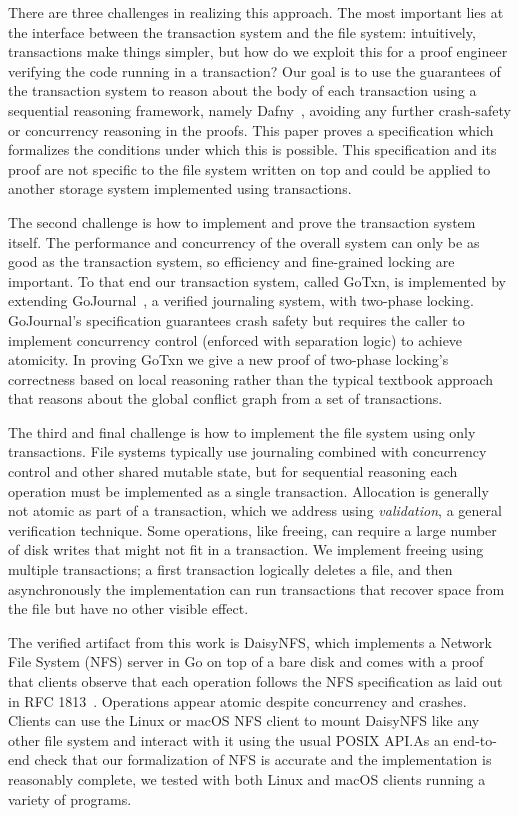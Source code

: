 There are three challenges in realizing this approach. The most important lies
at the interface between the transaction system and the file system:
intuitively, transactions make things simpler, but how do we exploit this for a
proof engineer verifying the code running in a transaction? Our goal is to use
the guarantees of the transaction system to reason about the body of each
transaction using a sequential reasoning framework, namely Dafny~\cite{leino:dafny}, avoiding any
further crash-safety or concurrency reasoning in the proofs. This paper proves a
specification which formalizes the conditions under which this is possible. This
specification and its proof are not specific to the file system written on top
and could be applied to another storage system implemented using transactions.

The second challenge is how to implement and prove the transaction system
itself. The performance and concurrency of the overall system can only be as
good as the transaction system, so efficiency and fine-grained locking are
important. To that end our transaction system, called GoTxn, is implemented by
extending GoJournal~\cite{chajed:gojournal}, a verified journaling system, with
two-phase locking. GoJournal's specification guarantees crash safety but
requires the caller to implement concurrency control (enforced with separation logic) to achieve atomicity.
In proving GoTxn we give a new proof of two-phase
locking's correctness based on local reasoning rather than
the typical textbook approach that reasons about the global conflict graph from
a set of transactions.

The third and final challenge is how to implement the file system using only
transactions. File systems typically use journaling combined with concurrency
control and other shared mutable state, but for sequential reasoning each
operation must be implemented as a single transaction. Allocation is generally
not atomic as part of a transaction, which we address using \emph{validation}, a
general verification technique.
Some operations, like freeing, can require a large
number of disk writes that might not fit in a transaction. We implement freeing
using multiple transactions; a first transaction logically deletes a file, and
then asynchronously the implementation can run transactions that recover space
from the file but have no other visible effect.

The verified artifact from this work is DaisyNFS, which implements a
Network File System (NFS) server in Go on top of a bare disk and comes
with a proof that clients observe that each operation follows the NFS
specification as laid out in RFC 1813~\cite{RFC:1813}. Operations appear atomic
despite concurrency and crashes. Clients can use the Linux or macOS
NFS client to mount DaisyNFS like any other file system and interact with
it using the usual POSIX API.\@  As an end-to-end check that our
formalization of NFS is accurate and the implementation is reasonably
complete, we tested with both Linux and macOS clients running a
variety of programs.

